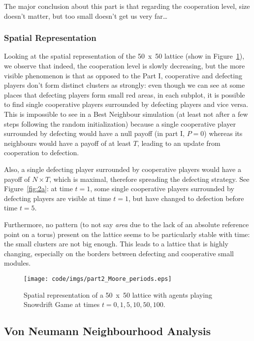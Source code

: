 \documentclass{article}
\begin{document}
The major conclusion about this part is that regarding the cooperation level, size doesn't matter, but too small
doesn't get us very far\ldots

\newpage

\subsubsection{Spatial Representation}

Looking at the spatial representation of the 50~x~50 lattice (show in Figure~\ref{fig:Spatial representation II.1}),
we observe that indeed, the cooperation level is slowly decreasing, but the more visible phenomenon is that
as opposed to the Part I, cooperative and defecting players don't form distinct clusters as strongly: even
though we can see at some places that defecting players form small red areas, in each subplot, it is
possible to find single cooperative players surrounded by defecting players and vice versa. This is
impossible to see in a Best Neighbour simulation (at least not after a few steps following the random
initialization) because a single cooperative player surrounded by defecting would have a null payoff
(in part I, $P=0$) whereas its neighbours would have a payoff of at least $T$, leading to an update from
cooperation to defection.

Also, a single defecting player surrounded by cooperative players would have a payoff of $N \times T$, which
is maximal, therefore spreading the defecting strategy. See Figure~\ref{fig:2a}: at time $t=1$, some
single cooperative players surrounded by defecting players are visible at time $t=1$, but have changed to
defection before time $t=5$.

Furthermore, no pattern (to not say \textit{area} due to the lack of an absolute reference point on a torus)
present on the lattice seems to be particularly stable with time: the small clusters are not big enough.
This leads to a lattice that is highly changing, especially on the borders between defecting and cooperative
small modules.

\begin{figure}[!t]
\hspace{-1.8cm}
\texttt{[image: code/imgs/part2\_Moore\_periods.eps]}
\caption{Spatial representation of a 50~x~50 lattice with agents playing Snowdrift Game at times $t=0,1,5,10,50,100$.
\label{fig:Spatial representation II.1}}
\end{figure}

\subsection{Von Neumann Neighbourhood Analysis}
\end{document}
